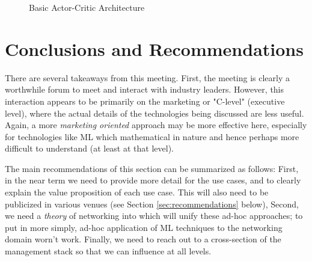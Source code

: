 \documentclass[11pt, oneside]{article}   	%
\begin{document}
\begin{figure}
\caption{Basic Actor-Critic Architecture}
\label{fig:ac_architecture}
\end{figure}


\section{Conclusions and Recommendations} 
\label{sec:conclusions}
There are several takeaways from this meeting. First, the meeting is clearly a worthwhile forum to meet and interact with industry leaders. However, this interaction appears to be primarily on the marketing or "C-level" (executive level), where the actual details of the technologies being discussed are less useful. Again, a more \emph{marketing oriented} approach may be more effective here, especially for technologies like ML which mathematical in nature and hence perhaps more difficult to understand (at least at that level). 

\bigskip
\noindent
The main recommendations of this section can be summarized as follows: First, in the near term we need to provide more detail for the use cases, and to clearly explain the value proposition of each use case. This will also need to be publicized in various venues (see Section \ref{sec:recommendations} below), Second, we need a \emph{theory} of networking into which will unify these ad-hoc approaches; to put in more simply, ad-hoc application of ML techniques 
to the networking domain worn't work. Finally, we need to reach out to a cross-section of the 
management stack so that we can influence at all levels.
\end{document}
